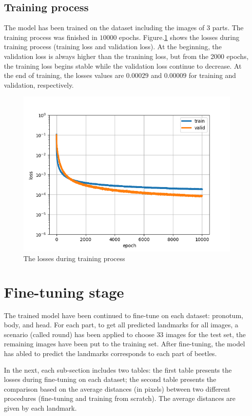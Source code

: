 \documentclass[12pt,a4paper]{article}
\begin{document}
\subsection{Training process}
The model has been trained on the dataset including the images of 3 parts. The training process was finished in $10000$ epochs. Figure.\ref{ptlosses} shows the losses during training process (training loss and validation loss). At the beginning, the validation loss is always higher than the tranining loss, but from the 2000 epochs, the training loss begins stable while the validation loss continue to decrease. At the end of training, the losses values are $0.00029$ and $0.00009$ for training and validation, respectively.
\begin{figure}[h!]
	\centering
	\includegraphics[scale=0.7]{images/fine_tuning/all_parts_10000epochs}
	\caption{The losses during training process}
	\label{ptlosses}
\end{figure}

\section{Fine-tuning stage}
The trained model have been continued to fine-tune\cite{} on each dataset: pronotum, body, and head. For each part, to get all predicted landmarks for all images, a scenario (called round) has been applied to choose $33$ images for the test set, the remaining images have been put to the training set. After fine-tuning, the model has abled to predict the landmarks corresponds to each part of beetles.

In the next, each sub-section includes two tables: the first table presents the losses during fine-tuning on each dataset; the second table presents the comparison based on the average distances (in pixels) between two different procedures (fine-tuning and training from scratch). The average distances are given by each landmark.
\end{document}

